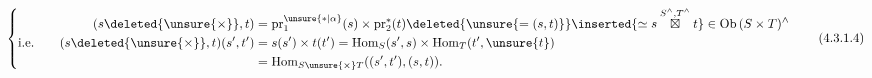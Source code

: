 
\[
\left\{\begin{aligned}
(s\deleted{\unsure{\times}},t)&=\mathrm{pr}_1^{\unsure{*|\alpha}}(s)\times\mathrm{pr}_2^{*}(t)
\deleted{\unsure{=(s,t)}}\inserted{\simeq s\overset{S^\wedge,T^\wedge}{\boxtimes}t}\in\mathrm{Ob}\,(S\times T)^\wedge\\
\text{i.e.}\qquad(s\deleted{\unsure{\times}},t)(s',t')&=s(s')\times t(t')=\mathrm{Hom}_{S}(s',s)\times\mathrm{Hom}_{T}(t',\unsure{t})\\
&=\mathrm{Hom}_{S\unsure{\times}T}((s',t'),(s,t)).
\end{aligned}\right.
\tag*{(4.3.1.4)}
\]

